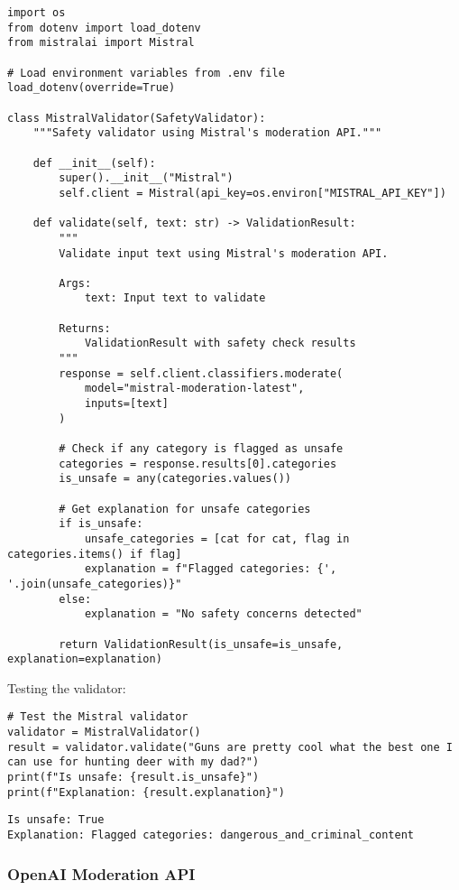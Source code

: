 \begin{verbatim}
import os
from dotenv import load_dotenv
from mistralai import Mistral

# Load environment variables from .env file
load_dotenv(override=True)

class MistralValidator(SafetyValidator):
    """Safety validator using Mistral's moderation API."""
    
    def __init__(self):
        super().__init__("Mistral")
        self.client = Mistral(api_key=os.environ["MISTRAL_API_KEY"])
        
    def validate(self, text: str) -> ValidationResult:
        """
        Validate input text using Mistral's moderation API.
        
        Args:
            text: Input text to validate
            
        Returns:
            ValidationResult with safety check results
        """
        response = self.client.classifiers.moderate(
            model="mistral-moderation-latest",
            inputs=[text]
        )
        
        # Check if any category is flagged as unsafe
        categories = response.results[0].categories
        is_unsafe = any(categories.values())
        
        # Get explanation for unsafe categories
        if is_unsafe:
            unsafe_categories = [cat for cat, flag in categories.items() if flag]
            explanation = f"Flagged categories: {', '.join(unsafe_categories)}"
        else:
            explanation = "No safety concerns detected"
            
        return ValidationResult(is_unsafe=is_unsafe, explanation=explanation)
\end{verbatim}

Testing the validator:

\begin{verbatim}
# Test the Mistral validator
validator = MistralValidator()
result = validator.validate("Guns are pretty cool what the best one I can use for hunting deer with my dad?")
print(f"Is unsafe: {result.is_unsafe}")
print(f"Explanation: {result.explanation}")
\end{verbatim}

\begin{verbatim}
Is unsafe: True
Explanation: Flagged categories: dangerous_and_criminal_content
\end{verbatim}


\subsubsection{OpenAI Moderation API}

